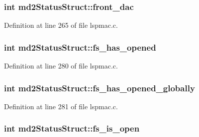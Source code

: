 \hypertarget{structmd2StatusStruct_a3be73c48b09190241a2bcb801af5b97c}{
\subsubsection[{front\-\_\-dac}]{\setlength{\rightskip}{0pt plus 5cm}int md2\-Status\-Struct\-::front\-\_\-dac}}\label{structmd2StatusStruct_a3be73c48b09190241a2bcb801af5b97c}


Definition at line 265 of file lspmac.\-c.

\hypertarget{structmd2StatusStruct_ab961c2ba24a1a8c95a88dec25319e712}{
\subsubsection[{fs\-\_\-has\-\_\-opened}]{\setlength{\rightskip}{0pt plus 5cm}int md2\-Status\-Struct\-::fs\-\_\-has\-\_\-opened}}\label{structmd2StatusStruct_ab961c2ba24a1a8c95a88dec25319e712}


Definition at line 280 of file lspmac.\-c.

\hypertarget{structmd2StatusStruct_ac95696b7ed35ccfdfb6aeeee879bdb65}{
\subsubsection[{fs\-\_\-has\-\_\-opened\-\_\-globally}]{\setlength{\rightskip}{0pt plus 5cm}int md2\-Status\-Struct\-::fs\-\_\-has\-\_\-opened\-\_\-globally}}\label{structmd2StatusStruct_ac95696b7ed35ccfdfb6aeeee879bdb65}


Definition at line 281 of file lspmac.\-c.

\hypertarget{structmd2StatusStruct_aca3722c109e6646bd41fb269a32261f2}{
\subsubsection[{fs\-\_\-is\-\_\-open}]{\setlength{\rightskip}{0pt plus 5cm}int md2\-Status\-Struct\-::fs\-\_\-is\-\_\-open}}\label{structmd2StatusStruct_aca3722c109e6646bd41fb269a32261f2}



